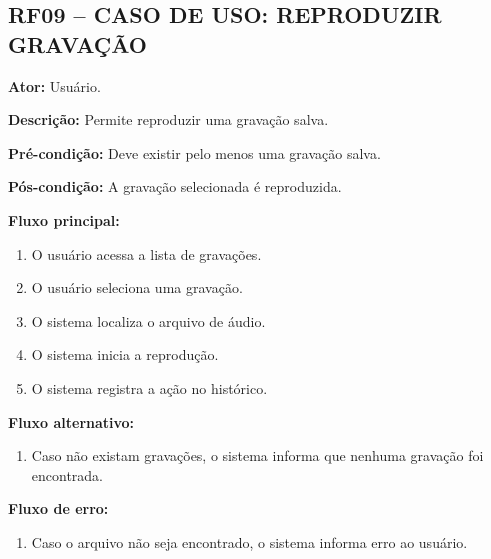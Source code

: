 \documentclass[12pt,oneside,a4paper,brazil,final]{abntex2}
\begin{document}
\clearpage
\subsection*{RF09 -- CASO DE USO: REPRODUZIR GRAVAÇÃO}



\textbf{Ator:} Usuário.



\textbf{Descrição:} Permite reproduzir uma gravação salva.



\textbf{Pré-condição:} Deve existir pelo menos uma gravação salva.



\textbf{Pós-condição:} A gravação selecionada é reproduzida.



\textbf{Fluxo principal:}

\begin{enumerate}

    \item O usuário acessa a lista de gravações.

    \item O usuário seleciona uma gravação.

    \item O sistema localiza o arquivo de áudio.

    \item O sistema inicia a reprodução.

    \item O sistema registra a ação no histórico.

\end{enumerate}



\textbf{Fluxo alternativo:}

\begin{enumerate}

    \item Caso não existam gravações, o sistema informa que nenhuma gravação foi encontrada.

\end{enumerate}



\textbf{Fluxo de erro:}

\begin{enumerate}

    \item Caso o arquivo não seja encontrado, o sistema informa erro ao usuário.

\end{enumerate}
\end{document}

